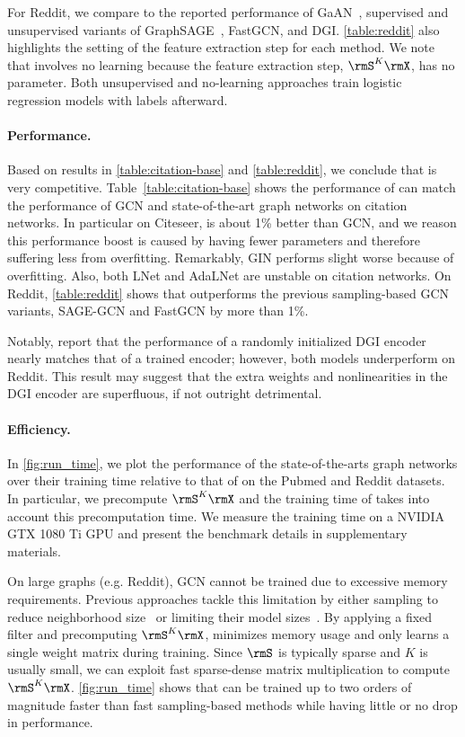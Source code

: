 For Reddit, we compare \method{} to the reported performance of GaAN~\cite{zhang2018gaan}, supervised and unsupervised variants of GraphSAGE~\cite{Hamilton17}, FastGCN, and DGI. \autoref{table:reddit} also highlights the setting of the feature extraction step for each method. 
We note that \method{} involves no learning because the feature extraction step, $\rmS^K\rmX$, has no parameter. Both unsupervised and no-learning approaches train logistic regression models with labels afterward.


\paragraph{Performance.}
Based on results in \autoref{table:citation-base} and \autoref{table:reddit}, we conclude that \method{} is very competitive. 
Table~\ref{table:citation-base} shows the performance of \method{} can match the performance of GCN and state-of-the-art graph networks on citation networks.
In particular on Citeseer, \method{} is about 1\% better than GCN, and we reason this performance boost is caused by \method{} having fewer parameters and therefore suffering less from overfitting.
Remarkably, GIN performs slight worse because of overfitting. Also, both LNet and AdaLNet are unstable on citation networks.
On Reddit, \autoref{table:reddit} shows that \method{} outperforms the previous sampling-based GCN variants, SAGE-GCN and FastGCN by more than 1\%. 

Notably, \citet{infomax} report that the performance of a randomly initialized DGI encoder nearly matches that of a trained encoder; however, both models underperform \method{} on Reddit.   
This result may suggest that the extra weights and nonlinearities in the DGI encoder are superfluous, if not outright detrimental. 

\paragraph{Efficiency.} 
In \autoref{fig:run_time}, we plot the performance of the state-of-the-arts graph networks over their training time relative to that of \method{} on the Pubmed and Reddit datasets. In particular, we precompute $\rmS^K\rmX$ and the training time of \method{} takes into account this precomputation time.
We measure the training time on a NVIDIA GTX 1080 Ti GPU and present the benchmark details in supplementary materials.

On large graphs (e.g. Reddit), GCN cannot be trained due to excessive memory requirements. 
Previous approaches tackle this limitation by either sampling to reduce neighborhood size~\cite{FastGCN, Hamilton17} or limiting their model sizes~\cite{infomax}.
By applying a fixed filter and precomputing $\rmS^K\rmX$, \method{} minimizes memory usage and only learns a single weight matrix during training. Since $\rmS$ is typically sparse and $K$ is usually small, we can exploit fast sparse-dense matrix multiplication to compute $\rmS^K\rmX$.
 \autoref{fig:run_time} shows that \method{} can be trained up to two orders of magnitude faster than fast sampling-based methods while having little or no drop in performance.

